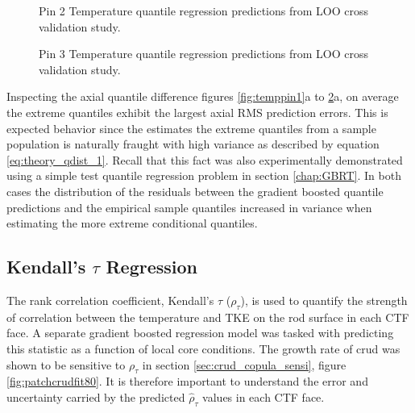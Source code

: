 \begin{figure}[H]%
    \centering
    \qquad
    \caption[Q-Q LOO Temperature pin 2 results.]{Pin 2 Temperature quantile regression predictions from LOO cross validation study.}%
    \label{fig:temppin2}%
\end{figure}

\begin{figure}[H]%
    \centering
    \qquad
    \caption[Q-Q LOO Temperature pin 3 results.]{Pin 3 Temperature quantile regression predictions from LOO cross validation study.}%
    \label{fig:temppin3}%
\end{figure}

Inspecting the axial quantile difference figures \ref{fig:temppin1}a to \ref{fig:temppin3}a, on average the extreme quantiles exhibit the largest axial RMS prediction errors.  This is expected behavior since the estimates the extreme quantiles from a sample population is naturally fraught with high variance as described by equation \ref{eq:theory_qdist_1}.  Recall that this fact was also experimentally demonstrated using a simple test quantile regression problem in section \ref{chap:GBRT}.  In both cases the distribution of the residuals between the gradient boosted quantile predictions and the empirical sample quantiles increased in variance when estimating the more extreme conditional quantiles.


\subsection{Kendall's $\tau$ Regression}

The rank correlation coefficient, Kendall's $\tau$ ($\rho_\tau$), is used to quantify the strength of correlation between the temperature and TKE on the rod surface in each CTF face.  A separate gradient boosted regression model was tasked with predicting this statistic as a function of local core conditions.   The growth rate of crud was shown to be sensitive to   $\rho_\tau$ in section \ref{sec:crud_copula_sensi}, figure \ref{fig:patchcrudfit80}.  It is therefore important to understand the error and uncertainty carried by the predicted $\hat \rho_\tau$ values in each CTF face.

